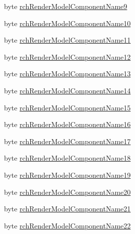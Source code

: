 \begin{DoxyCompactItemize}
\item 
byte \mbox{\hyperlink{struct_valve_1_1_v_r_1_1_input_origin_info__t_a8df9e720ac6c748bc42aa60bcbcbd1a3}{rch\+Render\+Model\+Component\+Name9}}
\item 
byte \mbox{\hyperlink{struct_valve_1_1_v_r_1_1_input_origin_info__t_aa96c7f27660e3fa75f809e5d15b7e3b0}{rch\+Render\+Model\+Component\+Name10}}
\item 
byte \mbox{\hyperlink{struct_valve_1_1_v_r_1_1_input_origin_info__t_ad0e9a26d63071931241a6074f4a0920b}{rch\+Render\+Model\+Component\+Name11}}
\item 
byte \mbox{\hyperlink{struct_valve_1_1_v_r_1_1_input_origin_info__t_a3cf1965bacc21a3242ae8e0740f244f8}{rch\+Render\+Model\+Component\+Name12}}
\item 
byte \mbox{\hyperlink{struct_valve_1_1_v_r_1_1_input_origin_info__t_ae19e8d1d23590b14e78987d57d03707d}{rch\+Render\+Model\+Component\+Name13}}
\item 
byte \mbox{\hyperlink{struct_valve_1_1_v_r_1_1_input_origin_info__t_ab8b2c74b099440e573e97dd3fea0a7e3}{rch\+Render\+Model\+Component\+Name14}}
\item 
byte \mbox{\hyperlink{struct_valve_1_1_v_r_1_1_input_origin_info__t_a55f4379cb0dd9a22c0ecd13389471acb}{rch\+Render\+Model\+Component\+Name15}}
\item 
byte \mbox{\hyperlink{struct_valve_1_1_v_r_1_1_input_origin_info__t_a5afeb6b3ce4a072d83190a679e1e942a}{rch\+Render\+Model\+Component\+Name16}}
\item 
byte \mbox{\hyperlink{struct_valve_1_1_v_r_1_1_input_origin_info__t_a1604689884b27c953fa17d28c5ce177b}{rch\+Render\+Model\+Component\+Name17}}
\item 
byte \mbox{\hyperlink{struct_valve_1_1_v_r_1_1_input_origin_info__t_aa9cc51990c85ea7bd72358272d024794}{rch\+Render\+Model\+Component\+Name18}}
\item 
byte \mbox{\hyperlink{struct_valve_1_1_v_r_1_1_input_origin_info__t_a61ab8c16d7bf1534b38208bc49723ad5}{rch\+Render\+Model\+Component\+Name19}}
\item 
byte \mbox{\hyperlink{struct_valve_1_1_v_r_1_1_input_origin_info__t_a37553c6aa8a9b2086bd79f3cc92076b1}{rch\+Render\+Model\+Component\+Name20}}
\item 
byte \mbox{\hyperlink{struct_valve_1_1_v_r_1_1_input_origin_info__t_abb987c8b220e781e7af40a18acd233d0}{rch\+Render\+Model\+Component\+Name21}}
\item 
byte \mbox{\hyperlink{struct_valve_1_1_v_r_1_1_input_origin_info__t_a8f7d8a486ac6612173c0064d7f4a2ad3}{rch\+Render\+Model\+Component\+Name22}}

\end{DoxyCompactItemize}
